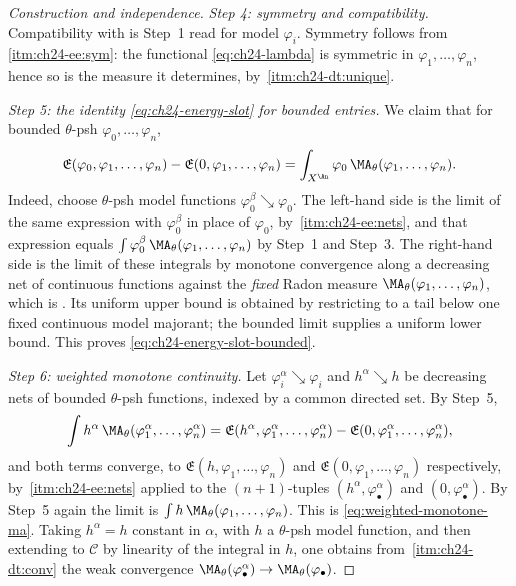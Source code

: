 \begin{proof}[Construction and independence]
\emph{Step 4: symmetry and compatibility.}  Compatibility with
 is Step~1 read for model $\varphi_i$.
Symmetry follows from
\,\cref{itm:ch24-ee:sym}: the functional
\eqref{eq:ch24-lambda} is symmetric in $\varphi_1,\ldots,\varphi_n$, hence
so is the measure it determines, by
\,\cref{itm:ch24-dt:unique}.

\emph{Step 5: the identity \eqref{eq:ch24-energy-slot} for bounded
entries.}  We claim that for bounded $\theta$-psh
$\varphi_0,\ldots,\varphi_n$,
\begin{equation}
\label{eq:ch24-energy-slot-bounded}
 \mathfrak E(\varphi_0,\varphi_1,\ldots,\varphi_n)
 -\mathfrak E(0,\varphi_1,\ldots,\varphi_n)
 =\int_{X^{\An}}\varphi_0\,\MA_\theta(\varphi_1,\ldots,\varphi_n).
\end{equation}
Indeed, choose $\theta$-psh model functions
$\varphi_0^\beta\searrow\varphi_0$.  The left-hand side is the limit of the
same expression with $\varphi_0^\beta$ in place of $\varphi_0$, by
\,\cref{itm:ch24-ee:nets}, and that
expression equals $\int\varphi_0^\beta\,
\MA_\theta(\varphi_1,\ldots,\varphi_n)$ by Step~1 and Step~3.  The
right-hand side is the limit of these integrals by monotone convergence
along a decreasing net of continuous functions against the \emph{fixed}
Radon measure $\MA_\theta(\varphi_1,\ldots,\varphi_n)$, which is
.  Its uniform upper bound is
obtained by restricting to a tail below one fixed continuous model
majorant; the bounded limit supplies a uniform lower bound.  This proves
\eqref{eq:ch24-energy-slot-bounded}.

\emph{Step 6: weighted monotone continuity.}  Let
$\varphi_i^\alpha\searrow\varphi_i$ and $h^\alpha\searrow h$ be
decreasing nets of bounded $\theta$-psh functions, indexed by a common
directed set.  By Step~5,
\[
 \int h^\alpha\,\MA_\theta(\varphi^\alpha_1,\ldots,\varphi^\alpha_n)
 =\mathfrak E(h^\alpha,\varphi^\alpha_1,\ldots,\varphi^\alpha_n)
  -\mathfrak E(0,\varphi^\alpha_1,\ldots,\varphi^\alpha_n),
\]
and both terms converge, to
$\mathfrak E(h,\varphi_1,\ldots,\varphi_n)$ and
$\mathfrak E(0,\varphi_1,\ldots,\varphi_n)$ respectively, by
\,\cref{itm:ch24-ee:nets} applied to the
$(n+1)$-tuples $(h^\alpha,\varphi^\alpha_\bullet)$ and
$(0,\varphi^\alpha_\bullet)$.  By Step~5 again the limit is
$\int h\,\MA_\theta(\varphi_1,\ldots,\varphi_n)$.  This is
\eqref{eq:weighted-monotone-ma}.  Taking $h^\alpha=h$ constant in
$\alpha$, with $h$ a $\theta$-psh model function, and then extending to
$\mathcal C$ by linearity of the integral in $h$, one obtains from
\,\cref{itm:ch24-dt:conv} the weak convergence
$\MA_\theta(\varphi^\alpha_\bullet)\to\MA_\theta(\varphi_\bullet)$.


\end{proof}
